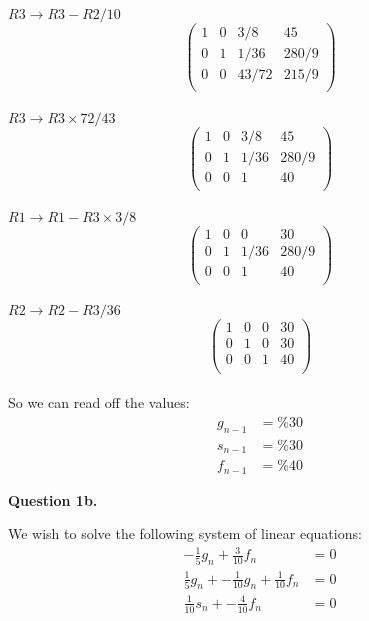 \documentclass[12pt,a4paper]{report}
\begin{document}
\(R3 \rightarrow R3 - R2 / 10 \)
  \[
 \left(\begin{array}{rrr|r}
 1 & 0 & 3/8 & 45   \\
 0 & 1 & 1/36 & 280/9  \\
 0 & 0 & 43/72 & 215/9  \\
   \end{array} \right)
\] \\
 
\(R3 \rightarrow R3 \times 72/43 \)
  \[
 \left(\begin{array}{rrr|r}
 1 & 0 & 3/8 & 45   \\
 0 & 1 & 1/36 & 280/9  \\
 0 & 0 & 1 & 40   \\
   \end{array} \right)
\] \\
 
\(R1 \rightarrow R1 - R3 \times 3/8 \)
  \[
 \left(\begin{array}{rrr|r}
 1 & 0 & 0 & 30   \\
 0 & 1 & 1/36 & 280/9  \\
 0 & 0 & 1 & 40   \\
   \end{array} \right)
\] \\
 
\(R2 \rightarrow R2 - R3 / 36 \)
  \[
 \left(\begin{array}{rrr|r}
 1 & 0 & 0 & 30   \\
 0 & 1 & 0 & 30   \\
 0 & 0 & 1 & 40   \\
   \end{array} \right)
\] \\

So we can read off the values:
\begin{align*}
 g_{n-1} &= \%30 \\
 s_{n-1} &= \%30 \\
 f_{n-1} &= \%40
\end{align*} 

\textbf{Question 1b.}

We wish to solve the following system of linear equations:
\begin{align*}
-\frac{1}{5}g_n + \frac{3}{10}f_n &= 0\\
\frac{1}{5}g_n + -\frac{1}{10}g_n + \frac{1}{10}f_n &= 0 \\
\frac{1}{10}s_n + -\frac{4}{10}f_n &= 0 \\
\end{align*} 
\end{document}
